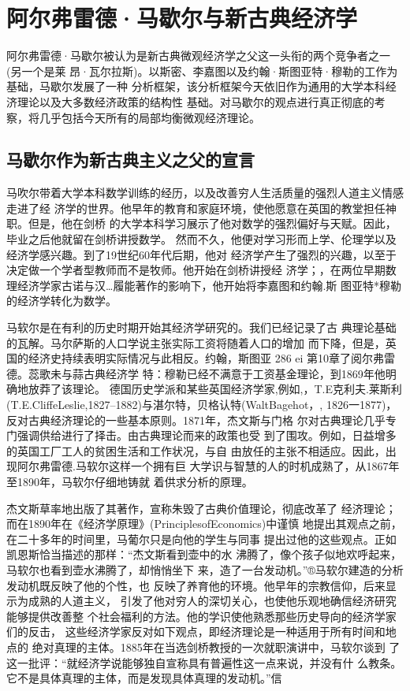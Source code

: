 \chapter{阿尔弗雷德·马歇尔与新古典经济学}

阿尔弗雷德·马歇尔被认为是新古典微观经济学之父这一头衔的两个竞争者之一(另一个是莱
昂·瓦尔拉斯)。以斯密、李嘉图以及约翰·斯图亚特·穆勒的工作为基础，马歇尔发展了一种
分析框架，该分析框架今天依旧作为通用的大学本科经济理论以及大多数经济政策的结构性
基础。对马歇尔的观点进行真正彻底的考察，将几乎包括今天所有的局部均衡微观经济理论。

\section*{马歇尔作为新古典主义之父的宣言}

马吹尔带着大学本科数学训练的经历，以及改善穷人生活质量的强烈人道主义情感走进了经
济学的世界。他早年的教育和家庭环境，使他愿意在英国的教堂担任神职。但是，他在剑桥
的大学本科学习展示了他对数学的强烈偏好与天赋。因此，毕业之后他就留在剑桥讲授数学。
然而不久，他便对学习形而上学、伦理学以及经济学感兴趣。到了19世纪60年代后期，他对
经济学产生了强烈的兴趣，以至于决定做一个学者型教师而不是牧师。他开始在剑桥讲授经
济学；，在两位早期数理经济学家古诺与汉…履能著作的影响下，他开始将李嘉图和约翰.斯
图亚特*穆勒的经济学转化为数学。

马软尔是在有利的历史时期开始其经济学研究的。我们已经记录了古
典理论基础的瓦解。马尔萨斯的人口学说主张实际工资将随着人口的增加
而下降，但是，英国的经济史持续表明实际情况与此相反。约翰，斯图亚
286
ei
第10章了阅尔弗雷德。蕊歌未与蒜古典经济学
特：穆勒已经不满意于工资基金理论，到1869年他明确地放莽了该理论。
德国历史学派和某些英国经济学家,例如,，T.E克利夫.莱斯利
(T.E.CliffeLeslie,1827--1882)与湛尔特，贝格认特(WaltBagehot，,
1826一1877)，反对古典经济理论的一些基本原则。1871年，杰文斯与门格
尔对古典理论几乎专门强调供给进行了择击。由古典理论而来的政策也受
到了围攻。例如，日益增多的英国工厂工人的贫困生活和工作状况，与自
由放任的主张不相适应。因此，出现阿尔弗雷德.马软尔这样一个拥有巨
大学识与智慧的人的时机成熟了，从1867年至1890年，马软尔仔细地铸就
着供求分析的原理。

杰文斯草率地出版了其著作，宣称朱毁了古典价值理论，彻底改革了
经济理论；而在1890年在《经济学原理》(PrinciplesofEconomics)中谨慎
地提出其观点之前，在二十多年的时间里，马葡尔只是向他的学生与同事
提出过他的这些观点。正如凯恩斯恰当描述的那样：“杰文斯看到壶中的水
沸腾了，像个孩子似地欢呼起来，马软尔也看到壶水沸腾了，却悄悄坐下
来，造了一台发动机。”®马软尔建造的分析发动机既反映了他的个性，也
反映了养育他的环境。他早年的宗教信仰，后来显示为成熟的人道主义，
引发了他对穷人的深切关心，也使他乐观地确信经济研究能够提供改善整
个社会福利的方法。他的学识使他熟悉那些历史导向的经济学家们的反击，
这些经济学家反对如下观点，即经济理论是一种适用于所有时间和地点的
绝对真理的主体。1885年在当选剑桥教授的一次就职演讲中，马软尔谈到
了这一批评：“就经济学说能够独自宣称具有普遍性这一点来说，并没有什
么教条。它不是具体真理的主体，而是发现具体真理的发动机。”信

